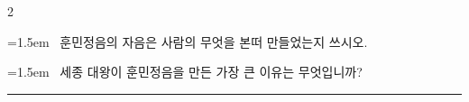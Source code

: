 \documentclass[11pt, a4paper]{article}
\begin{document}
\begin{multicols}{2}
\noindent\begin{minipage}{\columnwidth}
\vspace{2mm}
{\hangindent=1.5em  ~훈민정음의 자음은 사람의 무엇을 본떠 만들었는지 쓰시오.\par}

\vspace{3mm}
\noindent\hrulefill
\vspace{2.5mm}
\noindent\hrulefill
\vspace{2.5mm}
\noindent\hrulefill
\vspace{2.5mm}
\noindent\hrulefill
\vspace{2.5mm}
\noindent\hrulefill
\vspace{2.5mm}
\vspace{1mm}
\vspace{4mm}
\end{minipage}
\par

\noindent\begin{minipage}{\columnwidth}
\vspace{2mm}
{\hangindent=1.5em  ~세종 대왕이 훈민정음을 만든 가장 큰 이유는 무엇입니까?\par}

\vspace{3mm}
\noindent\hrulefill
\vspace{2.5mm}
\noindent\hrulefill
\vspace{2.5mm}
\noindent\hrulefill
\vspace{2.5mm}
\noindent\hrulefill
\vspace{2.5mm}
\noindent\hrulefill
\vspace{2.5mm}
\vspace{1mm}
\vspace{4mm}
\end{minipage}
\par

\end{multicols}
\newpage

\vspace{3mm}
\noindent\rule{\textwidth}{0.8pt}
\vspace{3mm}

\vspace{2mm}
\end{document}
